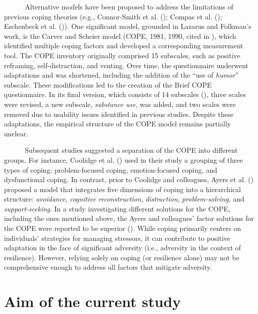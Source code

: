 \documentclass[
  man,floatsintext]{apa7}
\begin{document}
~~~~~~Alternative models have been proposed to address the limitations of previous coping theories (e.g., Connor-Smith et al. (); Compas et al. (); Eschenbeck et al. ()). One significant model, grounded in Lazarus and Folkman's work, is the Carver and Scheier model (COPE, 1981, 1990, cited in ), which identified multiple coping factors and developed a corresponding measurement tool. The COPE inventory originally comprised 15 subscales, such as positive reframing, self-distraction, and venting. Over time, the questionnaire underwent adaptations and was shortened, including the addition of the ``use of \emph{humor}'' subscale. These modifications led to the creation of the Brief COPE questionnaire. In its final version, which consists of 14 subscales (), three scales were revised, a new subscale, \emph{substance use}, was added, and two scales were removed due to usability issues identified in previous studies. Despite these adaptations, the empirical structure of the COPE model remains partially unclear.

~~~~~~Subsequent studies suggested a separation of the COPE into different groups. For instance, Coolidge et al. () used in their study a grouping of three types of coping: problem-focused coping, emotion-focused coping, and dysfunctional coping. In contrast, prior to Coolidge and colleagues, Ayers et al. () proposed a model that integrates five dimensions of coping into a hierarchical structure: \emph{avoidance}, \emph{cognitive reconstruction}, \emph{distraction}, \emph{problem-solving}, and \emph{support-seeking}. In a study investigating different solutions for the COPE, including the ones mentioned above, the Ayers and colleagues' factor solutions for the COPE were reported to be superior (). While coping primarily centers on individuals' strategies for managing stressors, it can contribute to positive adaptation in the face of significant adversity (i.e., adversity in the context of resilience). However, relying solely on coping (or resilience alone) may not be comprehensive enough to address all factors that mitigate adversity.

\section{Aim of the current study}\label{aim-of-the-current-study}
\end{document}
